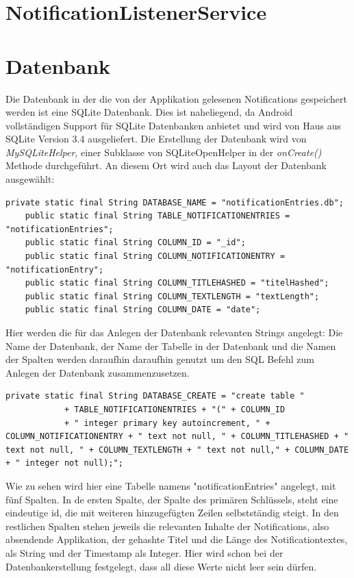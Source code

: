 \section{NotificationListenerService}

\section{Datenbank}

Die Datenbank in der die von der Applikation gelesenen Notifications gespeichert werden ist eine SQLite Datenbank.
Dies ist naheliegend, da Android vollständigen Support für SQLite Datenbanken anbietet und wird von Haus aus SQLite Version 3.4 ausgeliefert.
Die Erstellung der Datenbank wird von \emph{MySQLiteHelper}, einer Subklasse von SQLiteOpenHelper in der \emph{onCreate()} Methode durchgeführt.
An diesem Ort wird auch das Layout der Datenbank ausgewählt:

\begin{lstlisting}[frame=single, caption = Datenbank Strings, label=databasestrings] 
    private static final String DATABASE_NAME = "notificationEntries.db";
    public static final String TABLE_NOTIFICATIONENTRIES = "notificationEntries"; 
    public static final String COLUMN_ID = "_id";
    public static final String COLUMN_NOTIFICATIONENTRY = "notificationEntry";
    public static final String COLUMN_TITLEHASHED = "titelHashed";
    public static final String COLUMN_TEXTLENGTH = "textLength";
    public static final String COLUMN_DATE = "date";
\end{lstlisting}

Hier werden die für das Anlegen der Datenbank relevanten Strings angelegt:
Die Name der Datenbank, der Name der Tabelle in der Datenbank und die Namen der Spalten werden daraufhin daraufhin genutzt um den SQL Befehl zum Anlegen der Datenbank zusammenzusetzen.

\begin{lstlisting}[frame=single, caption = Datenbank Creation String, label=databasecreation] 
    private static final String DATABASE_CREATE = "create table "
            + TABLE_NOTIFICATIONENTRIES + "(" + COLUMN_ID
            + " integer primary key autoincrement, " + COLUMN_NOTIFICATIONENTRY + " text not null, " + COLUMN_TITLEHASHED + " text not null, " + COLUMN_TEXTLENGTH + " text not null," + COLUMN_DATE + " integer not null);";

\end{lstlisting}

Wie zu sehen wird hier eine Tabelle namens "notificationEntries" angelegt, mit fünf Spalten.
In de ersten Spalte, der Spalte des primären Schlüssels, steht eine eindeutige id, die mit weiteren hinzugefügten Zeilen selbstständig steigt.
In den restlichen Spalten stehen jeweils die relevanten Inhalte der Notifications, also absendende Applikation, der gehashte Titel und die Länge des Notificationtextes, als String und der Timestamp als Integer. 
Hier wird schon bei der Datenbankerstellung festgelegt, dass all diese Werte nicht leer sein dürfen.

